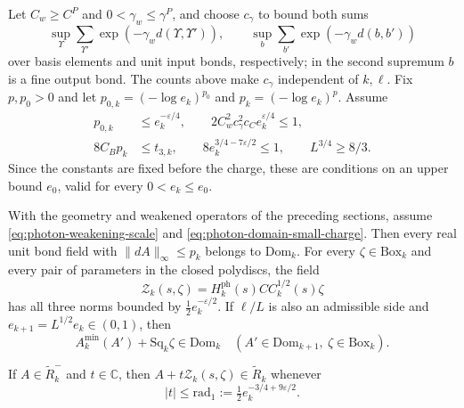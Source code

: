 \documentclass[11pt,letterpaper,reqno]{amsart}
\newcommand{\C}{\mathbb C}
\begin{document}
Let $C_w\ge C^P$ and $0<\gamma_w\le\gamma^P$, and choose
$c_\gamma$ to bound both sums
\[
 \sup_\Upsilon\sum_{\Upsilon'}\exp(-\gamma_wd(\Upsilon,\Upsilon')),
 \qquad
 \sup_b\sum_{b'}\exp(-\gamma_wd(b,b'))
\]
over basis elements and unit input bonds, respectively; in the
second supremum $b$ is a fine output bond.
The counts above make $c_\gamma$ independent of $k,\ell$.
Fix $p,p_0>0$ and let $p_{0,k}=(-\log e_k)^{p_0}$ and $p_k=(-\log e_k)^p$.
Assume
\begin{equation}\label{eq:photon-domain-small-charge}
 \begin{split}
 p_{0,k}&\le e_k^{-\varepsilon/4},\qquad
 2C_w^2c_\gamma^2c_Ce_k^{\varepsilon/4}\le1,\\
 8C_Bp_k&\le t_{3,k},\qquad
 8e_k^{3/4-7\varepsilon/2}\le1,\qquad
 L^{3/4}\ge8/3.
 \end{split}
\end{equation}
Since the constants are fixed before the charge, these are
conditions on an upper bound $e_0$, valid for every
$0<e_k\le e_0$.

\begin{theorem}\label{prop:photon-domain-preservation}
With the geometry and weakened operators of the preceding sections,
assume \eqref{eq:photon-weakening-scale} and
\eqref{eq:photon-domain-small-charge}. Then every real unit
bond field with $\|dA\|_\infty\le p_k$ belongs to
$\mathrm{Dom}_k$. For every $\zeta\in\mathrm{Box}_k$ and every
pair of parameters in the closed polydiscs, the field
\[
 \mathscr Z_k(s,\zeta)
       =H_k^{\mathrm{ph}}(s)C C_k^{1/2}(s)\zeta
\]
has all three norms bounded by $\frac12e_k^{-\varepsilon/2}$.
If $\ell/L$ is also an admissible side and
$e_{k+1}=L^{1/2}e_k\in(0,1)$, then
\begin{equation}\label{eq:photon-domain-preserved-one-step}
 A_k^{\min}(A')+\mathrm{Sq}_k\zeta\in\mathrm{Dom}_k
 \quad(A'\in\mathrm{Dom}_{k+1},\ \zeta\in\mathrm{Box}_k).
\end{equation}

If $A\in\widetilde R_k^-$ and $t\in\C$, then
$A+t\mathscr Z_k(s,\zeta)\in\widetilde R_k$ whenever
\begin{equation}\label{eq:photon-fluctuation-analytic-radius}
 |t|\le\mathrm{rad}_1:=\tfrac12e_k^{-3/4+9\varepsilon/2}.
\end{equation}
\end{theorem}
\end{document}

